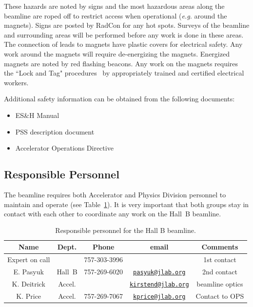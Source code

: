 These hazards are noted by signs and the most hazardous areas along the beamline are 
roped off to restrict access when operational ({\it e.g.} around the magnets). Signs are posted 
by RadCon for any hot spots. Surveys of the beamline and surrounding areas will be 
performed before any work is done in these areas. The connection of leads to magnets have 
plastic covers for electrical safety. Any work around the magnets will require 
de-energizing the magnets. Energized magnets are noted by red flashing beacons. Any work 
on the magnets requires the ``Lock and Tag" procedures~\cite{esh} by appropriately trained
and certified electrical workers.

Additional safety information can be obtained from the following documents:
\begin{itemize}[label=$\circ$]

\item ES\&H Manual~\cite{esh} 

\item PSS description document~\cite{pss}

\item Accelerator Operations Directive~\cite{ops}

\end{itemize} 

\subsection{Responsible Personnel}

The beamline requires both Accelerator and Physics Division personnel to maintain and 
operate (see Table~\ref{tb:beam}). It is very important that both groups stay in contact
with each other to coordinate any work on the Hall~B beamline. 

\begin{table}[!ht]
\centering
\begin{tabular}{|c|c|c|c|c|} \hline
 Name&Dept.&Phone&email&Comments \\ \hline
Expert on call& &757-303-3996&& 1st contact \\ \hline
E. Pasyuk  & Hall~B&757-269-6020&\href{mailto:pasyuk@jlab.org}{\nolinkurl{pasyuk@jlab.org}}&2nd contact \\ \hline
K. Deitrick & Accel.&&\href{mailto:kirstend@jlab.org}{\nolinkurl{kirstend@jlab.org}}& beamline optics\\ \hline
K. Price      & Accel.&757-269-7067&\href{mailto:kprice@jlab.org}{\nolinkurl{kprice@jlab.org}}&Contact to OPS \\ \hline
\end{tabular}
\caption{Responsible personnel for the Hall B beamline.} 
\label{tb:beam}
\end{table}

